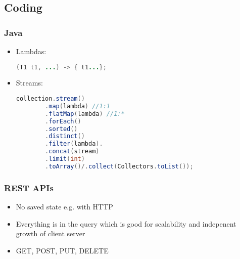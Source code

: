 \documentclass[10pt]{article}
\begin{document}
\begin{comment}
\subsubsection{Static}
If you know the keys ahead of time, use primary hash function to find out where they go to, then build secondary perfect hash functions. This will be $O(1)$ worst case and $O(n)$ space, since you know ahead of time how large to make your secondary arrays.
\end{comment}

\subsection{Coding}
\subsubsection{Java}
\begin{itemize}
    \item Lambdas:
    \begin{lstlisting}[language=java]
    (T1 t1, ...) -> { t1...};
    \end{lstlisting}
    \item Streams:
    \begin{lstlisting}[language=java]
    collection.stream()
        .map(lambda) //1:1
        .flatMap(lambda) //1:*
        .forEach()
        .sorted()
        .distinct()
        .filter(lambda).
        .concat(stream)
        .limit(int)
        .toArray()/.collect(Collectors.toList());
    \end{lstlisting}
\end{itemize}

\subsubsection{REST APIs}
\begin{itemize}
    \item No saved state e.g. with HTTP
    \item Everything is in the query which is good for scalability and indepenent growth of client server
    \item GET, POST, PUT, DELETE
\end{itemize}
\end{document}
